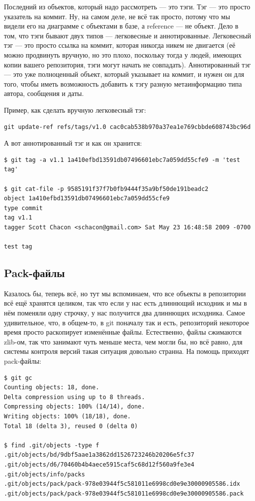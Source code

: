 \documentclass[a5paper]{article}
\begin{document}
Последний из объектов, который надо рассмотреть --- это тэги. Тэг --- это просто указатель на коммит. Ну, на самом деле, не всё так просто, потому что мы видели его на диаграмме с объектами в базе, а reference --- не объект. Дело в том, что тэги бывают двух типов --- легковесные и аннотированные. Легковесный тэг --- это просто ссылка на коммит, которая никогда никем не двигается (её можно продвинуть вручную, но это плохо, поскольку тогда у людей, имеющих копии вашего репозитория, тэги могут начать не совпадать). Аннотированный тэг --- это уже полноценный объект, который указывает на коммит, и нужен он для того, чтобы иметь возможность добавить к тэгу разную метаинформацию типа автора, сообщения и даты.

Пример, как сделать вручную легковесный тэг:
\begin{verbatim}
git update-ref refs/tags/v1.0 cac0cab538b970a37ea1e769cbbde608743bc96d
\end{verbatim}

А вот аннотированный тэг и как он хранится:
\begin{verbatim}
$ git tag -a v1.1 1a410efbd13591db07496601ebc7a059dd55cfe9 -m 'test tag'

$ git cat-file -p 9585191f37f7b0fb9444f35a9bf50de191beadc2
object 1a410efbd13591db07496601ebc7a059dd55cfe9
type commit
tag v1.1
tagger Scott Chacon <schacon@gmail.com> Sat May 23 16:48:58 2009 -0700

test tag
\end{verbatim}

\subsection{Pack-файлы}

Казалось бы, теперь всё, но тут мы вспоминаем, что все объекты в репозитории всё ещё хранятся целиком, так что если у нас есть длиннющий исходник и мы в нём поменяли одну строчку, у нас получится два длиннющих исходника. Самое удивительное, что, в общем-то, в git поначалу так и есть, репозиторий некоторое время просто раскопирует изменённые файлы. Естественно, файлы сжимаются zlib-ом, так что занимают чуть меньше места, чем могли бы, но всё равно, для системы контроля версий такая ситуация довольно странна. На помощь приходят pack-файлы:

\begin{verbatim}
$ git gc
Counting objects: 18, done.
Delta compression using up to 8 threads.
Compressing objects: 100% (14/14), done.
Writing objects: 100% (18/18), done.
Total 18 (delta 3), reused 0 (delta 0)

$ find .git/objects -type f
.git/objects/bd/9dbf5aae1a3862dd1526723246b20206e5fc37
.git/objects/d6/70460b4b4aece5915caf5c68d12f560a9fe3e4
.git/objects/info/packs
.git/objects/pack/pack-978e03944f5c581011e6998cd0e9e30000905586.idx
.git/objects/pack/pack-978e03944f5c581011e6998cd0e9e30000905586.pack
\end{verbatim}
\end{document}
